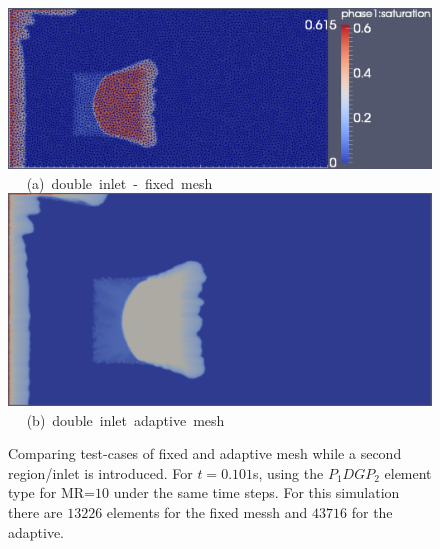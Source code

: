 \begin{landscape}
\begin{figure}[ht] 
\vbox{
\hbox{\hspace{3.5cm}
\includegraphics[width=.9\textwidth]{./Pics1/mr10_5regions_fixed_dinlet/5regions_dinlet_fixed_100_1.pdf}
}
\vspace{0.0cm}
\hbox{\hspace{6.5cm} (a) double inlet - fixed mesh   
}
\hbox{\hspace{3.5cm}
  \includegraphics[width=.67\textwidth]{./Pics1/mr10_5regions_adapt_dinlet/5regions_dinlet_adapt_start.pdf}
}
\vspace{0.0cm}
\hbox{\hspace{6.5cm} (b) double inlet adaptive mesh   
}
}     
\caption{Comparing test-cases of fixed and adaptive mesh while a second region/inlet is introduced. For $t=0.101$s, using the $P_{1}DGP_{2}$ element type for MR=$10$ under the same time steps. For this simulation there are $13226$ elements for the fixed messh and $43716$ for the adaptive.}
\label{fig:3testcase_a}
\end{figure}
\end{landscape}
\clearpage

